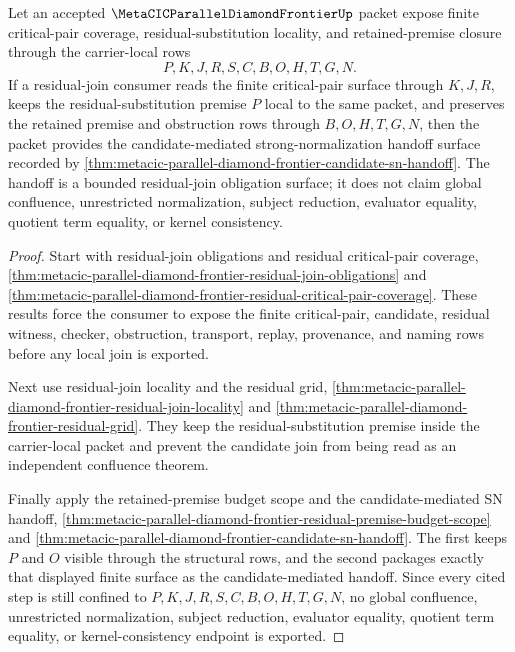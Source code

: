 \begin{theorem}
\label{thm:metacic-parallel-diamond-frontier-residual-join-obligation-handoff}
Let an accepted $\MetaCICParallelDiamondFrontierUp$ packet expose finite critical-pair coverage, residual-substitution locality, and retained-premise closure through the carrier-local rows
$$
P,K,J,R,S,C,B,O,H,T,G,N.
$$
If a residual-join consumer reads the finite critical-pair surface through $K,J,R$, keeps the residual-substitution premise $P$ local to the same packet, and preserves the retained premise and obstruction rows through $B,O,H,T,G,N$, then the packet provides the candidate-mediated strong-normalization handoff surface recorded by \autoref{thm:metacic-parallel-diamond-frontier-candidate-sn-handoff}. The handoff is a bounded residual-join obligation surface; it does not claim global confluence, unrestricted normalization, subject reduction, evaluator equality, quotient term equality, or kernel consistency.
\end{theorem}
\begin{proof}
Start with residual-join obligations and residual critical-pair coverage, \autoref{thm:metacic-parallel-diamond-frontier-residual-join-obligations} and \autoref{thm:metacic-parallel-diamond-frontier-residual-critical-pair-coverage}. These results force the consumer to expose the finite critical-pair, candidate, residual witness, checker, obstruction, transport, replay, provenance, and naming rows before any local join is exported.

Next use residual-join locality and the residual grid, \autoref{thm:metacic-parallel-diamond-frontier-residual-join-locality} and \autoref{thm:metacic-parallel-diamond-frontier-residual-grid}. They keep the residual-substitution premise inside the carrier-local packet and prevent the candidate join from being read as an independent confluence theorem.

Finally apply the retained-premise budget scope and the candidate-mediated SN handoff, \autoref{thm:metacic-parallel-diamond-frontier-residual-premise-budget-scope} and \autoref{thm:metacic-parallel-diamond-frontier-candidate-sn-handoff}. The first keeps $P$ and $O$ visible through the structural rows, and the second packages exactly that displayed finite surface as the candidate-mediated handoff. Since every cited step is still confined to $P,K,J,R,S,C,B,O,H,T,G,N$, no global confluence, unrestricted normalization, subject reduction, evaluator equality, quotient term equality, or kernel-consistency endpoint is exported.
\end{proof}

